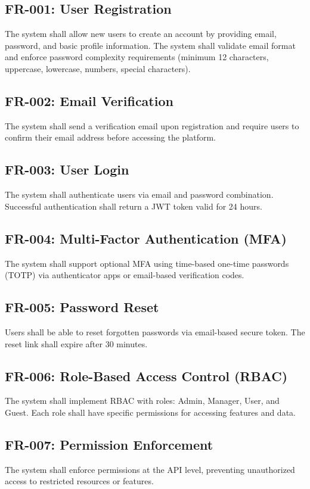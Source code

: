 \documentclass{report}
\begin{document}
\subsection{FR-001: User Registration}
The system shall allow new users to create an account by providing email, password, and basic profile information. The system shall validate email format and enforce password complexity requirements (minimum 12 characters, uppercase, lowercase, numbers, special characters).

\subsection{FR-002: Email Verification}
The system shall send a verification email upon registration and require users to confirm their email address before accessing the platform.

\subsection{FR-003: User Login}
The system shall authenticate users via email and password combination. Successful authentication shall return a JWT token valid for 24 hours.

\subsection{FR-004: Multi-Factor Authentication (MFA)}
The system shall support optional MFA using time-based one-time passwords (TOTP) via authenticator apps or email-based verification codes.

\subsection{FR-005: Password Reset}
Users shall be able to reset forgotten passwords via email-based secure token. The reset link shall expire after 30 minutes.

\subsection{FR-006: Role-Based Access Control (RBAC)}
The system shall implement RBAC with roles: Admin, Manager, User, and Guest. Each role shall have specific permissions for accessing features and data.

\subsection{FR-007: Permission Enforcement}
The system shall enforce permissions at the API level, preventing unauthorized access to restricted resources or features.
\end{document}
